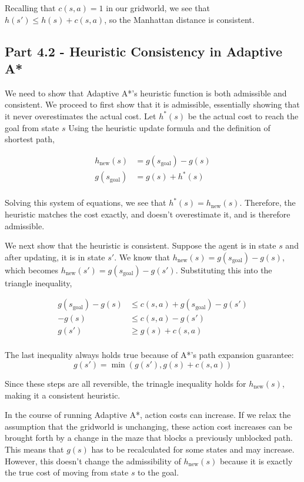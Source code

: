 \documentclass[12pt]{article}
\begin{document}
Recalling that $c(s, a) = 1$ in our gridworld,
we see that $h(s') \leq h(s) + c(s, a)$,
so the Manhattan distance is consistent.

\subsection{Part 4.2 - Heuristic Consistency in Adaptive A*}

We need to show that Adaptive A*'s heuristic function is both admissible and consistent.
We proceed to first show that it is admissible,
essentially showing that it never overestimates the actual cost.
Let $h^* (s)$ be the actual cost to reach the goal from state $s$
Using the heuristic update formula and the definition of shortest path,

\begin{align*}
    h_{\text{new}} (s) &= g(s_{\text{goal}}) - g(s) \\
    g(s_{\text{goal}}) &= g(s) + h^*(s) \\
\end{align*}

Solving this system of equations,
we see that 
$h^* (s) = h_{\text{new}} (s)$.
Therefore,
the heuristic matches the cost exactly,
and doesn't overestimate it,
and is therefore admissible.

We next show that the heuristic is consistent.
Suppose the agent is in state $s$ and after updating,
it is in state $s'$.
We know that 
$h_{\text{new}} (s) = g(s_{\text{goal}}) - g(s)$,
which becomes
$h_{\text{new}} (s') = g(s_{\text{goal}}) - g(s')$.
Substituting this into the triangle inequality,

\begin{align*}
g(s_{\text{goal}}) - g(s) & \leq c(s, a) + g(s_{\text{goal}}) - g(s') \\
-g(s) & \leq c(s, a) - g(s') \\
g(s') & \geq g(s) + c(s, a) \\
\end{align*}

The last inequality always holds true because of A*'s path expansion guarantee:
$$g(s') = \min(g(s'), g(s) + c(s, a))$$

Since these steps are all reversible,
the trinagle inequality holds for $h_{\text{new}} (s)$,
making it a consistent heuristic.

In the course of running Adaptive A*,
action costs can increase.
If we relax the assumption that the gridworld is unchanging,
these action cost increases can be brought forth by a change in the maze that blocks a previously unblocked path.
This means that 
$g(s)$ 
has to be recalculated for some states and may increase.
However,
this doesn't change the admissibility of $h_\text{new} (s)$
because it is exactly the true cost of moving from state 
$s$
to the goal.
\end{document}
